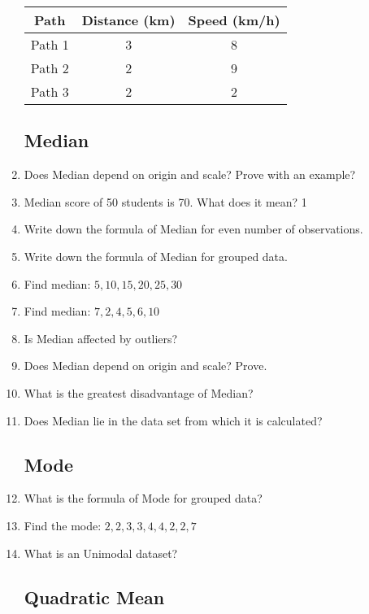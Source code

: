 \documentclass[a4paper,oneside]{book}
\begin{document}
\begin{enumerate}
    \begin{table}[h]
    \centering
\begin{tabular}{c|c|c}
Path   & Distance (km) & Speed (km/h) \\ \hline
Path 1 & 3             & 8            \\ \hline 
Path 2 & 2             & 9            \\ \hline
Path 3 & 2             & 2           
\end{tabular}
\end{table}

\subsection{Median}

    \item Does Median depend on origin and scale? Prove with an example?
    \item Median score of 50 students is 70. What does it mean? \hfill 1
    \item Write down the formula of Median for even number of observations.
    \item Write down the formula of Median for grouped data.
    \item Find median: $5,10, 15, 20, 25, 30$
    \item Find median: $7,  2,  4,  5,  6, 10$
    \item Is Median affected by outliers?
    \item Does Median depend on origin and scale? Prove.
    \item What is the greatest disadvantage of Median?
    \item Does Median lie in the data set from which it is calculated?
    
\subsection{Mode}

    \item What is the formula of Mode for grouped data?
    \item Find the mode: $2,2,3,3,4,4,2,2,7$
    \item What is an Unimodal dataset?

\subsection{Quadratic Mean}


\end{enumerate}
\end{document}
